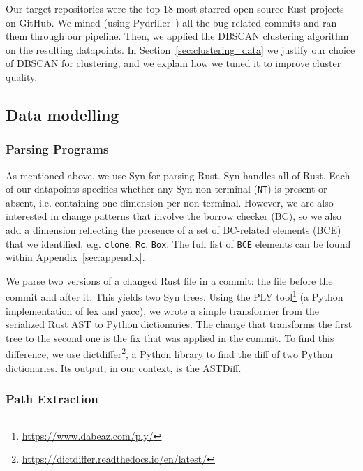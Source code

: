 Our target repositories were the top 18 most-starred open source Rust projects on GitHub. We mined (using Pydriller~\cite{spadini2018pydriller}) all the bug related commits and ran them through our pipeline. Then, we applied the DBSCAN clustering algorithm~\cite{ester1996density} on the resulting datapoints. In Section~\ref{sec:clustering_data} we justify our choice of DBSCAN for clustering, and we explain how we tuned it to improve cluster quality. 

\subsection{\label{sec:data_modelling}Data modelling}

\subsubsection{\label{sec:parsing_programs}Parsing Programs}

As mentioned above, we use Syn for parsing Rust. Syn handles all of Rust. Each of our datapoints specifies whether any Syn non terminal (\texttt{NT}) is present or absent, i.e. containing one dimension per non terminal. However, we are also interested in change patterns that involve the borrow checker (BC), so we also add a dimension reflecting the presence of a set of BC-related elements (BCE) that we identified, e.g. \texttt{clone}, \texttt{Rc}, \texttt{Box}. The full list of \verb+BCE+ elements can be found within Appendix~\ref{sec:appendix}.

We parse two versions of a changed Rust file in a commit: the file before the commit and after it. This yields two Syn trees. Using the PLY tool\footnote{\url{https://www.dabeaz.com/ply/}} (a Python implementation of lex and yacc), we wrote a simple transformer from the serialized Rust AST to Python dictionaries. The change that transforms the first tree to the second one is the fix that was applied in the commit. To find this difference, we use dictdiffer\footnote{\url{https://dictdiffer.readthedocs.io/en/latest/}}, a Python library to find the diff of two Python dictionaries. Its output, in our context, is the ASTDiff.

\subsubsection{\label{sec:path_extraction}Path Extraction}



